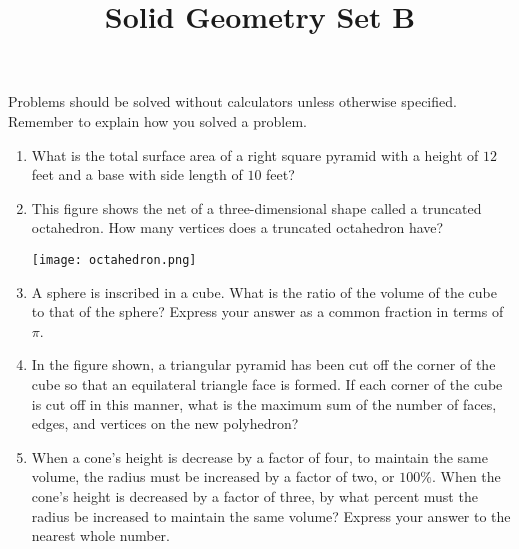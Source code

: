 \documentclass{article}
\title{Solid Geometry Set B}
\author{}
\date{}
\begin{document}
\maketitle
\noindent Problems should be solved without calculators unless otherwise specified.
Remember to explain how you solved a problem.
\begin{multicols}{2}
    \begin{enumerate}
        \item What is the total surface area of a right square pyramid with a height of $12$ feet and a base with side length of $10$ feet?
        \vspace{3cm}
        \item This figure shows the net of a three-dimensional shape called a truncated octahedron.
        How many vertices does a truncated octahedron have?
        \begin{center}
            \texttt{[image: octahedron.png]}
        \end{center}
        \vspace{3cm}
        \item A sphere is inscribed in a cube.
        What is the ratio of the volume of the cube to that of the sphere?
        Express your answer as a common fraction in terms of $\pi$.
        \vspace{3cm}
        \item In the figure shown, a triangular pyramid has been cut off the corner of the cube so that an equilateral triangle face is formed.
        If each corner of the cube is cut off in this manner, what is the maximum sum of the number of faces, edges, and vertices on the new polyhedron?
        \begin{center}
        \end{center}
        \vspace{3cm}
        \item When a cone's height is decrease by a factor of four, to maintain the same volume, the radius must be increased by a factor of two, or $100\%$.
        When the cone's height is decreased by a factor of three, by what percent must the radius be increased to maintain the same volume?
        Express your answer to the nearest whole number.
        \vspace{3cm}
    \end{enumerate}
\end{multicols}
\end{document}
